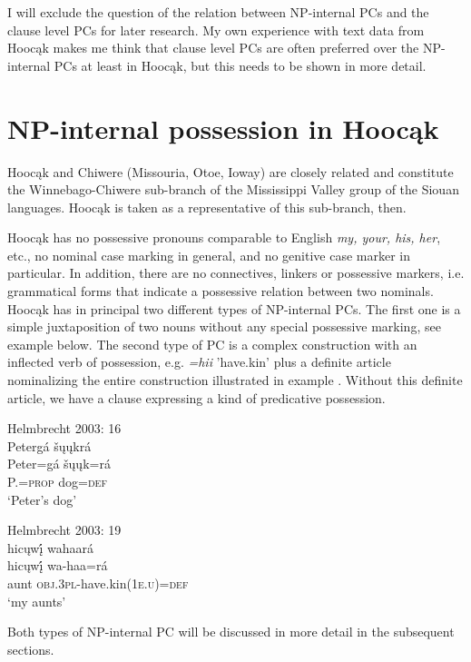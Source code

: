 \documentclass[output=paper]{LSP/langsci}
\begin{document}
I will exclude the question of the relation between NP-internal PCs and the clause level PCs for later research. My own experience with text data from Hoocąk makes me think that clause level PCs are often preferred over the NP-internal PCs at least in Hoocąk, but this needs to be shown in more detail. 

\section{NP-internal possession in Hoocąk}

Hoocąk and Chiwere (Missouria, Otoe, Ioway) are closely related and constitute the Winnebago-Chiwere sub-branch of the Mississippi Valley group of the Siouan languages. Hoocąk is taken as a representative of this sub-branch, then. 

Hoocąk has no possessive pronouns comparable to English \textit{my, your, his, her}, etc., no nominal case marking in general, and no genitive case marker in particular. In addition, there are no connectives, linkers or possessive markers, i.e. grammatical forms that indicate a possessive relation between two nominals. Hoocąk has in principal two different types of NP-internal PCs. The first one is a simple juxtaposition of two nouns without any special possessive marking, see example  below. The second type of PC is a complex construction with an inflected verb of possession, e.g. \textit{=hii} 'have.kin' plus a definite article nominalizing the entire construction illustrated in example . Without this definite article, we have a clause expressing a kind of predicative possession. 

\ea  \label{petersdog}
 {}{Helmbrecht 2003: 16} \\
\ea
\glll Petergá šųųkrá\\
Peter=gá     šųųk=rá \\
P.=\textsc{prop}    dog=\textsc{def} \\
\glt `Peter's dog'

\ex	 \label{myaunts}
 {}{Helmbrecht 2003: 19} \\
\glll hicųwį́ wahaará\\
hicųwį́  wa-haa=rá \\
aunt     \textsc{obj.3pl}-have.kin(\textsc{1e.u})=\textsc{def} \\
\glt `my aunts'
\z
\z

Both types of NP-internal PC will be discussed in more detail in the subsequent sections.
\end{document}

